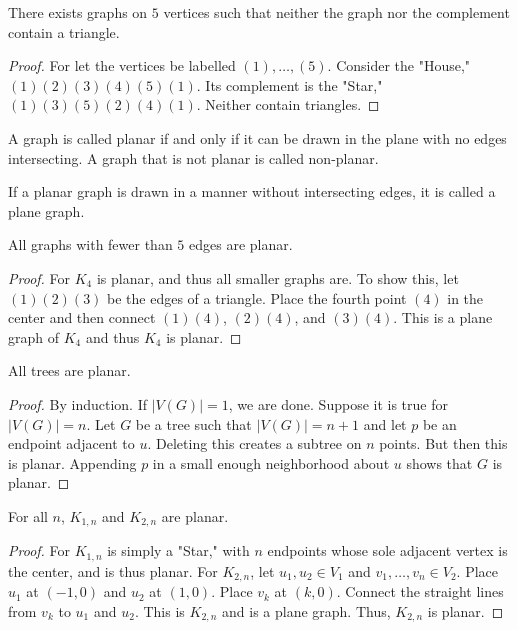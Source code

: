 \documentclass[crop=false,class=book,oneside]{standalone}
\begin{document}
        \begin{theorem}
        There exists graphs on $5$ vertices such that neither the graph nor the complement contain a triangle.
        \end{theorem}
        \begin{proof}
        For let the vertices be labelled $(1),\hdots,(5)$. Consider the "House," $(1)(2)(3)(4)(5)(1)$. Its complement is the "Star," $(1)(3)(5)(2)(4)(1)$. Neither contain triangles.
        \end{proof}
        \begin{definition}
        A graph is called planar if and only if it can be drawn in the plane with no edges intersecting. A graph that is not planar is called non-planar.
        \end{definition}
        \begin{definition}
        If a planar graph is drawn in a manner without intersecting edges, it is called a plane graph.
        \end{definition}
        \begin{corollary}
        All graphs with fewer than $5$ edges are planar.
        \end{corollary}
        \begin{proof}
        For $K_4$ is planar, and thus all smaller graphs are. To show this, let $(1)(2)(3)$ be the edges of a triangle. Place the fourth point $(4)$ in the center and then connect $(1)(4)$, $(2)(4)$, and $(3)(4)$. This is a plane graph of $K_4$ and thus $K_4$ is planar.
        \end{proof}
        \begin{theorem}
        All trees are planar.
        \end{theorem}
        \begin{proof}
        By induction. If $|V(G)| = 1$, we are done. Suppose it is true for $|V(G)| = n$. Let $G$ be a tree such that $|V(G)| = n+1$ and let $p$ be an endpoint adjacent to $u$. Deleting this creates a subtree on $n$ points. But then this is planar. Appending $p$ in a small enough neighborhood about $u$ shows that $G$ is planar.
        \end{proof}
        \begin{theorem}
        For all $n$, $K_{1,n}$ and $K_{2,n}$ are planar.
        \end{theorem}
        \begin{proof}
        For $K_{1,n}$ is simply a "Star," with $n$ endpoints whose sole adjacent vertex is the center, and is thus planar. For $K_{2,n}$, let $u_1,u_2 \in V_1$ and $v_1,\hdots, v_n \in V_2$. Place $u_1$ at $(-1,0)$ and $u_2$ at $(1,0)$. Place $v_k$ at $(k,0)$. Connect the straight lines from $v_k$ to $u_1$ and $u_2$. This is $K_{2,n}$ and is a plane graph. Thus, $K_{2,n}$ is planar.
        \end{proof}
\end{document}
